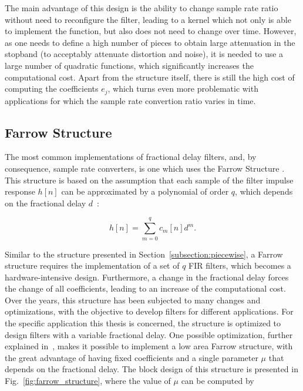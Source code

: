 The main advantage of this design is the ability to change sample rate ratio
without need to reconfigure the filter, leading to a kernel which not only is
able to implement the function, but also does not need to change over
time. However, as one needs to define a high number of pieces to obtain large
attenuation in the stopband (to acceptably attenuate distortion and noise), it
is needed to use a large number of quadratic functions, which significantly
increases the computational cost. Apart from the structure itself, there is
still the high cost of computing the coefficients $e_j$, which turns even more
problematic with applications for which the sample rate convertion ratio varies
in time.

\subsection{Farrow Structure}

The most common implementations of fractional delay filters, and, by
consequence, sample rate converters, is one which uses the Farrow Structure
\cite{Farrow:farrow_structure}.  This structure is based on the assumption that
each sample of the filter impulse response $h[n]$ can be approximated by a
polynomial of order $q$, which depends on the fractional delay
$d$~\cite{Blok:VariableRS}:

\begin{equation}
	h[n] = \sum_{m=0}^{q} c_m[n]d^m.
	\label{eq:farrow_approx}
\end{equation}

Similar to the structure presented in Section~\ref{subsection:piecewise}, a
Farrow structure requires the implementation of a set of $q$ FIR filters, which
becomes a hardware-intensive design. Furthermore, a change in the fractional
delay forces the change of all coefficients, leading to an increase of the
computational cost. Over the years, this structure has been subjected to many
changes and optimizations, with the objective to develop filters for different
applications. For the specific application this thesis is concerned, the
structure is optimized to design filters with a variable fractional delay.  One
possible optimization, further explained in~\cite{babic:farrow_optimization},
makes it possible to implement a low area Farrow structure, with the great
advantage of having fixed coefficients and a single parameter $\mu$ that depends
on the fractional delay. The block design of this structure is presented in
Fig.~\ref{fig:farrow_structure}, where the value of $\mu$ can be computed by

